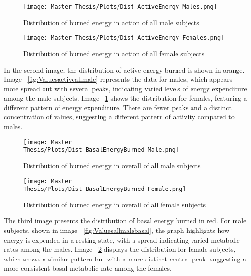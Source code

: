\FloatBarrier
\begin{figure}[h!]
  \centering
  \begin{minipage}[b]{0.7\linewidth}
    \texttt{[image: Master Thesis/Plots/Dist\_ActiveEnergy\_Males.png]}
    \caption{Distribution of burned energy in action of all male subjects}
    \label{fig:Valuesactiveallmale}
  \end{minipage}%
  \quad
  \begin{minipage}[b]{0.7\linewidth}
    \texttt{[image: Master Thesis/Plots/Dist\_ActiveEnergy\_Females.png]}
    \caption{Distribution of burned energy in action of all female subjects}
    \label{fig:Valuesactiveallfemale}
  \end{minipage}
\end{figure}
\FloatBarrier

In the second image, the distribution of active energy burned is shown in orange. Image ~\ref{fig:Valuesactiveallmale} represents the data for males, which appears more spread out with several peaks, indicating varied levels of energy expenditure among the male subjects. Image ~\ref{fig:Valuesactiveallfemale} shows the distribution for females, featuring a different pattern of energy expenditure. There are fewer peaks and a distinct concentration of values, suggesting a different pattern of activity compared to males.

\FloatBarrier
\begin{figure}[h!]
  \centering
  \begin{minipage}[b]{0.7\linewidth}
    \texttt{[image: Master Thesis/Plots/Dist\_BasalEnergyBurned\_Male.png]}
     \caption{Distribution of burned energy in overall of all male subjects}
    \label{fig:Valuesallmalebasal}
  \end{minipage}%
  \quad
  \begin{minipage}[b]{0.7\linewidth}
    \texttt{[image: Master Thesis/Plots/Dist\_BasalEnergyBurned\_Female.png]}
    \caption{Distribution of burned energy in overall of all female subjects}
    \label{fig:Valuesallfemalebasal}
  \end{minipage}
\end{figure}
\FloatBarrier

The third image presents the distribution of basal energy burned in red. For male subjects, shown in image ~\ref{fig:Valuesallmalebasal}, the graph highlights how energy is expended in a resting state, with a spread indicating varied metabolic rates among the males. Image ~\ref{fig:Valuesallfemalebasal} displays the distribution for female subjects, which shows a similar pattern but with a more distinct central peak, suggesting a more consistent basal metabolic rate among the females.


